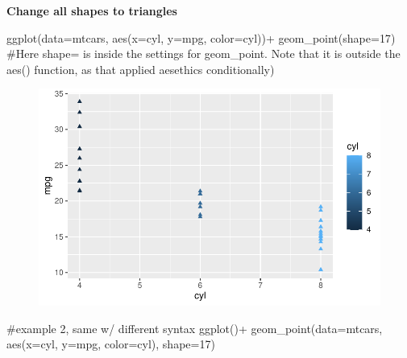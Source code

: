 \documentclass[
  letterpaper,
  DIV=11,
  numbers=noendperiod]{scrartcl}
\newenvironment{Shaded}{\begin{snugshade}}{\end{snugshade}}
\newcommand{\AttributeTok}[1]{\textcolor[rgb]{0.40,0.45,0.13}{#1}}
\newcommand{\CommentTok}[1]{\textcolor[rgb]{0.37,0.37,0.37}{#1}}
\newcommand{\DecValTok}[1]{\textcolor[rgb]{0.68,0.00,0.00}{#1}}
\newcommand{\FunctionTok}[1]{\textcolor[rgb]{0.28,0.35,0.67}{#1}}
\newcommand{\NormalTok}[1]{\textcolor[rgb]{0.00,0.23,0.31}{#1}}
\newcommand{\SpecialCharTok}[1]{\textcolor[rgb]{0.37,0.37,0.37}{#1}}
\begin{document}
\textbf{Change all shapes to triangles}

\begin{Shaded}
\begin{Highlighting}[]
\FunctionTok{ggplot}\NormalTok{(}\AttributeTok{data=}\NormalTok{mtcars, }\FunctionTok{aes}\NormalTok{(}\AttributeTok{x=}\NormalTok{cyl, }\AttributeTok{y=}\NormalTok{mpg, }\AttributeTok{color=}\NormalTok{cyl))}\SpecialCharTok{+}
  \FunctionTok{geom\_point}\NormalTok{(}\AttributeTok{shape=}\DecValTok{17}\NormalTok{) }\CommentTok{\#Here \textquotesingle{}shape=\textquotesingle{} is inside the settings for geom\_point. Note that it is outside the aes() function, as that applied aesethics conditionally)}
\end{Highlighting}
\end{Shaded}

\begin{figure}[H]

{\centering \includegraphics{Lab_2_files/figure-pdf/unnamed-chunk-29-1.pdf}

}

\end{figure}

\begin{Shaded}
\begin{Highlighting}[]
\CommentTok{\#example 2, same w/ different syntax}
\FunctionTok{ggplot}\NormalTok{()}\SpecialCharTok{+}
  \FunctionTok{geom\_point}\NormalTok{(}\AttributeTok{data=}\NormalTok{mtcars, }\FunctionTok{aes}\NormalTok{(}\AttributeTok{x=}\NormalTok{cyl, }\AttributeTok{y=}\NormalTok{mpg, }\AttributeTok{color=}\NormalTok{cyl), }\AttributeTok{shape=}\DecValTok{17}\NormalTok{)}
\end{Highlighting}
\end{Shaded}
\end{document}
